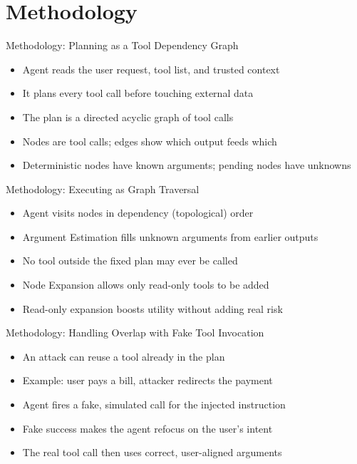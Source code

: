 \documentclass[10pt]{beamer}
\begin{document}
\section{Methodology}
\begin{frame}[allowframebreaks]{Methodology: Planning as a Tool Dependency Graph}
\begin{itemize}
  \item Agent reads the user request, tool list, and trusted context
  \item It plans every tool call before touching external data
  \item The plan is a directed acyclic graph of tool calls
  \item Nodes are tool calls; edges show which output feeds which
  \item Deterministic nodes have known arguments; pending nodes have unknowns
\end{itemize}
\end{frame}
\begin{frame}[allowframebreaks]{Methodology: Executing as Graph Traversal}
\begin{itemize}
  \item Agent visits nodes in dependency (topological) order
  \item Argument Estimation fills unknown arguments from earlier outputs
  \item No tool outside the fixed plan may ever be called
  \item Node Expansion allows only read-only tools to be added
  \item Read-only expansion boosts utility without adding real risk
\end{itemize}
\end{frame}
\begin{frame}[allowframebreaks]{Methodology: Handling Overlap with Fake Tool Invocation}
\begin{itemize}
  \item An attack can reuse a tool already in the plan
  \item Example: user pays a bill, attacker redirects the payment
  \item Agent fires a fake, simulated call for the injected instruction
  \item Fake success makes the agent refocus on the user's intent
  \item The real tool call then uses correct, user-aligned arguments
\end{itemize}
\end{frame}
\end{document}
